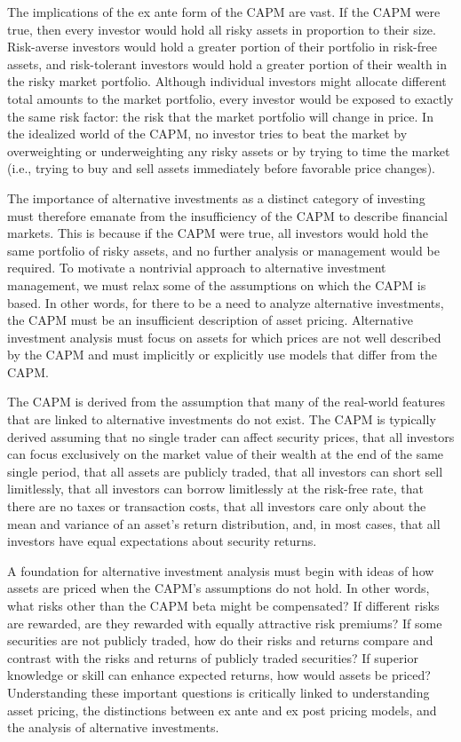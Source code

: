 \documentclass[11pt]{article}
\begin{document}
The implications of the ex ante form of the CAPM are vast. If the CAPM were true, then every investor would hold all risky assets in proportion to their size. Risk-averse investors would hold a greater portion of their portfolio in risk-free assets, and risk-tolerant investors would hold a greater portion of their wealth in the risky market portfolio. Although individual investors might allocate different total amounts to the market portfolio, every investor would be exposed to exactly the same risk factor: the risk that the market portfolio will change in price. In the idealized world of the CAPM, no investor tries to beat the market by overweighting or underweighting any risky assets or by trying to time the market (i.e., trying to buy and sell assets immediately before favorable price changes).

The importance of alternative investments as a distinct category of investing must therefore emanate from the insufficiency of the CAPM to describe financial markets. This is because if the CAPM were true, all investors would hold the same portfolio of risky assets, and no further analysis or management would be required. To motivate a nontrivial approach to alternative investment management, we must relax some of the assumptions on which the CAPM is based. In other words, for there to be a need to analyze alternative investments, the CAPM must be an insufficient description of asset pricing. Alternative investment analysis must focus on assets for which prices are not well described by the CAPM and must implicitly or explicitly use models that differ from the CAPM.

The CAPM is derived from the assumption that many of the real-world features that are linked to alternative investments do not exist. The CAPM is typically derived assuming that no single trader can affect security prices, that all investors can focus exclusively on the market value of their wealth at the end of the same single period, that all assets are publicly traded, that all investors can short sell limitlessly, that all investors can borrow limitlessly at the risk-free rate, that there are no taxes or transaction costs, that all investors care only about the mean and variance of an asset's return distribution, and, in most cases, that all investors have equal expectations about security returns.

A foundation for alternative investment analysis must begin with ideas of how assets are priced when the CAPM's assumptions do not hold. In other words, what risks other than the CAPM beta might be compensated? If different risks are rewarded, are they rewarded with equally attractive risk premiums? If some securities are not publicly traded, how do their risks and returns compare and contrast with the risks and returns of publicly traded securities? If superior knowledge or skill can enhance expected returns, how would assets be priced? Understanding these important questions is critically linked to understanding asset pricing, the distinctions between ex ante and ex post pricing models, and the analysis of alternative investments.
\end{document}
